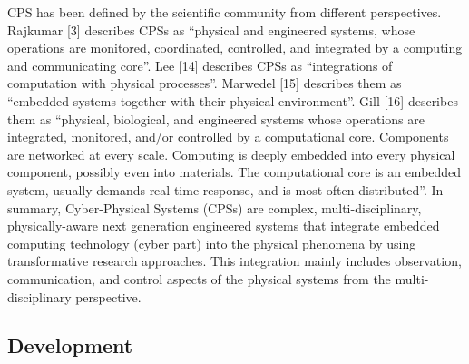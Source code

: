CPS has been defined by the scientific community from different perspectives. Rajkumar [3]
describes CPSs as “physical and engineered systems, whose operations are monitored,
coordinated, controlled, and integrated by a computing and communicating core”. Lee [14]
describes CPSs as “integrations of computation with physical processes”. Marwedel [15]
describes them as “embedded systems together with their physical environment”. Gill [16]
describes them as “physical, biological, and engineered systems whose operations are integrated,
monitored, and/or controlled by a computational core. Components are networked at every scale.
Computing is deeply embedded into every physical component, possibly even into materials. The
computational core is an embedded system, usually demands real-time response, and is most often
distributed”.
In summary, Cyber-Physical Systems (CPSs) are complex, multi-disciplinary,
physically-aware next generation engineered systems that integrate embedded computing
technology (cyber part) into the physical phenomena by using transformative research
approaches. This integration mainly includes observation, communication, and control aspects of
the physical systems from the multi-disciplinary perspective.

\subsection{Development}

